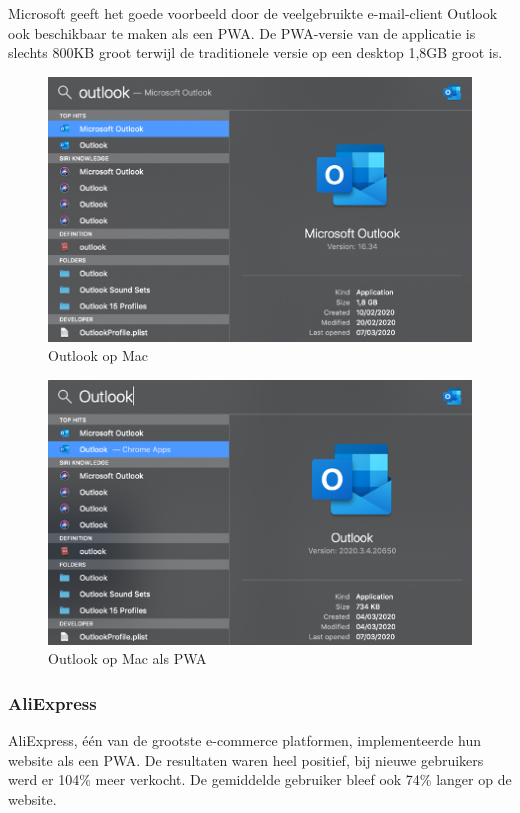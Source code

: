 		Microsoft geeft het goede voorbeeld door de veelgebruikte e-mail-client Outlook ook beschikbaar te maken als een PWA.
		De PWA-versie van de applicatie is slechts 800KB groot terwijl de traditionele versie op een desktop 1,8GB groot is.
		\begin{figure}[H]
			\centering
			\includegraphics{./img/Outlook_native.png}
			\caption{Outlook op Mac}
		\end{figure}
		
		\begin{figure}[H]
			\centering
			\includegraphics{./img/Outlook_pwa.png}
			\caption{Outlook op Mac als PWA}
		\end{figure}
		
	\subsubsection{AliExpress}
		
		AliExpress, één van de grootste e-commerce platformen, implementeerde hun website als een PWA. De resultaten waren heel positief, bij nieuwe gebruikers werd er 104\% meer verkocht. De gemiddelde gebruiker bleef ook 74\% langer op de website.
		\autocite{Developers2020}
	
